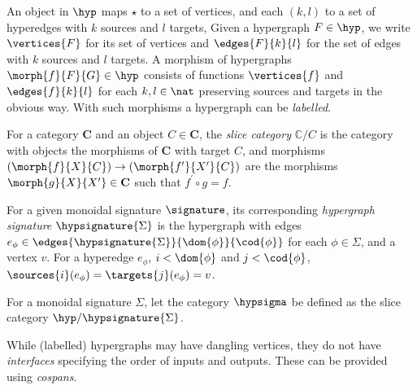An object in \(\hyp\) maps \(\star\) to a set of vertices, and each \((k,l)\) to
a set of hyperedges with \(k\) sources and \(l\) targets,
Given a hypergraph \(F \in \hyp\), we write \(\vertices{F}\) for its set of
vertices and \(\edges{F}{k}{l}\) for the set of edges with \(k\) sources and
\(l\) targets.
A morphism of hypergraphs \(\morph{f}{F}{G} \in \hyp\) consists of functions
\(\vertices{f}\) and \(\edges{f}{k}{l}\) for each \(k,l \in \nat\) preserving
sources and targets in the obvious way.
With such morphisms a hypergraph can be \emph{labelled}.

\begin{definition}
    For a category \(\mathbf{C}\) and an object \(C \in \mathbf{C}\), the
    \emph{slice category} \(\mathbb{C} / C\) is the category with objects the
    morphisms of \(\mathbf{C}\) with target \(C\), and morphisms \(
        (\morph{f}{X}{C}) \to (\morph{f^\prime}{X^\prime}{C})
    \) are the morphisms \(\morph{g}{X}{X^\prime} \in \mathbf{C}\) such that
    \(f^\prime \circ g = f\).
\end{definition}


\begin{definition}
    For a given monoidal signature \(\signature\), its corresponding
    \emph{hypergraph signature} \(\hypsignature{\Sigma}\) is the hypergraph with
    edges \(
        e_\phi \in \edges{\hypsignature{\Sigma}}{\dom{\phi}}{\cod{\phi}}
    \) for each \(\phi \in \Sigma\), and a vertex \(v\).
    For a hyperedge \(e_\phi\), \(i < \dom{\phi}\) and \(j < \cod{\phi}\), \(
        \sources{i}(e_\phi) = \targets{j}(e_\phi) = v
    \).
\end{definition}

\begin{definition}
    For a monoidal signature \(\Sigma\), let the category \(\hypsigma\) be
    defined as the slice category \(\hyp / \hypsignature{\Sigma}\).
\end{definition}

While (labelled) hypergraphs may have dangling vertices, they do not have
\emph{interfaces} specifying the order of inputs and outputs.
These can be provided using \emph{cospans}.

